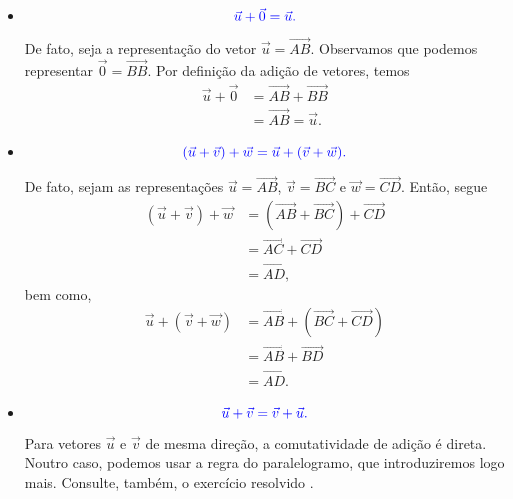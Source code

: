 \begin{itemize}
\item {}
  \begin{equation}\color{blue}\vec{u} + \vec{0} = \vec{u}.
  \end{equation}
  
  De fato, seja a representação do vetor $\vec{u} = \overrightarrow{AB}$. Observamos que podemos representar $\vec{0} = \overrightarrow{BB}$. Por definição da adição de vetores, temos 
  \begin{align}
    \vec{u} + \vec{0} &= \overrightarrow{AB} + \overrightarrow{BB}\\ 
    &= \overrightarrow{AB} = \vec{u}.
  \end{align}

  \item {}
    \begin{equation}\color{blue}(\vec{u} + \vec{v}) + \vec{w} = \vec{u} + (\vec{v} + \vec{w}).
    \end{equation}

    De fato, sejam as representações $\vec{u} = \overrightarrow{AB}$, $\vec{v} = \overrightarrow{BC}$ e $\vec{w} = \overrightarrow{CD}$. Então, segue
    \begin{align}
      \left(\vec{u} + \vec{v}\right)+\vec{w} &= \left(\overrightarrow{AB}+\overrightarrow{BC}\right)+\overrightarrow{CD} \\
                                             &= \overrightarrow{AC} + \overrightarrow{CD} \\
                                             &= \overrightarrow{AD},
    \end{align}
    bem como,
    \begin{align}
      \vec{u} + \left(\vec{v} + \vec{w}\right) &= \overrightarrow{AB}+\left(\overrightarrow{BC}+\overrightarrow{CD}\right) \\
                                             &= \overrightarrow{AB} + \overrightarrow{BD} \\
                                             &= \overrightarrow{AD}.
    \end{align}

  \item {}
    \begin{equation}\color{blue}\vec{u} + \vec{v} = \vec{v} + \vec{u}.
    \end{equation}

    Para vetores $\vec{u}$ e $\vec{v}$ de mesma direção, a comutatividade de adição é direta. Noutro caso, podemos usar a regra do paralelogramo, que introduziremos logo mais. Consulte, também, o exercício resolvido .

\end{itemize}

